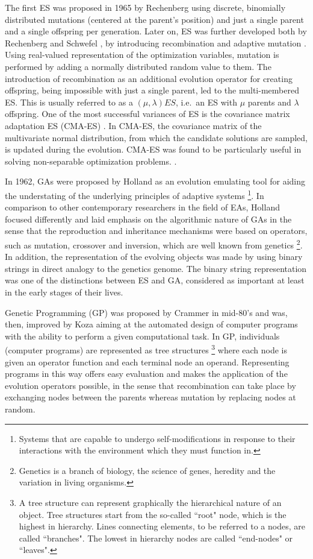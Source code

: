 The first ES was proposed in 1965 by Rechenberg \cite{Rechenberg_1965} using discrete, binomially distributed mutations (centered at the parent's position) and just a single parent and a single offspring per generation. Later on, ES was further developed both by Rechenberg \cite{Rechenberg71} and Schwefel \cite{Schwefel75}, by introducing recombination and adaptive mutation \cite{Rechenberg71}. Using real-valued representation of the optimization variables, mutation is performed by adding a normally distributed random value to them. The introduction of recombination as an additional evolution operator for creating offspring, being impossible with just a single parent, led to the multi-membered ES. This is usually referred to as a $(\mu, \lambda)ES$, i.e.\ an ES with $\mu$ parents and $\lambda$ offspring. One of the most successful variances of ES is the covariance matrix adaptation ES (CMA-ES) \cite{hansen2003ecj}. In CMA-ES, the covariance matrix of the multivariate normal distribution, from which the candidate solutions are sampled, is updated during the evolution. CMA-ES was found to be particularly useful in solving non-separable optimization problems. \cite{hansen2001ecj,hansen1997ecj}.

In 1962, GAs were proposed by Holland \cite{Holland:1962:OLT:321127.321128,holland_1975} as an evolution emulating tool for aiding the understating of the underlying principles of adaptive systems \footnote{Systems that are capable to undergo self-modifications in response to their interactions with the environment which they must function in.}. In comparison to other contemporary researchers in the field of EAs, Holland focused differently and laid emphasis on the algorithmic nature of GAs in the sense that the reproduction and inheritance  mechanisms were based on operators, such as mutation, crossover and inversion, which are well known from genetics \footnote{Genetics is a branch of biology, the science of genes, heredity and the variation in living organisms.}. In addition, the representation of the evolving objects was made by using binary strings in direct analogy to the genetics genome. The binary string representation was one of the distinctions between ES and GA, considered as important at least in the early stages of their lives.  
 
Genetic Programming (GP) was proposed by Crammer in mid-80's \cite{cramer85} and was, then, improved by Koza \cite{Koz94} aiming at the automated design of computer programs with the ability to perform a given computational task. In GP, individuals (computer programs) are represented as tree structures \footnote{A tree structure can represent graphically the hierarchical nature of an object. Tree structures start from the so-called ``root" node, which is the highest in hierarchy. Lines connecting elements, to be referred to a nodes, are called ``branches". The lowest in hierarchy nodes are called ``end-nodes" or ``leaves". } where each node is given an operator function and each terminal node an operand. Representing programs in this way offers easy evaluation and makes the application of the evolution operators possible, in the sense that recombination can take place by exchanging nodes between the parents whereas mutation by replacing nodes at random. 
 

